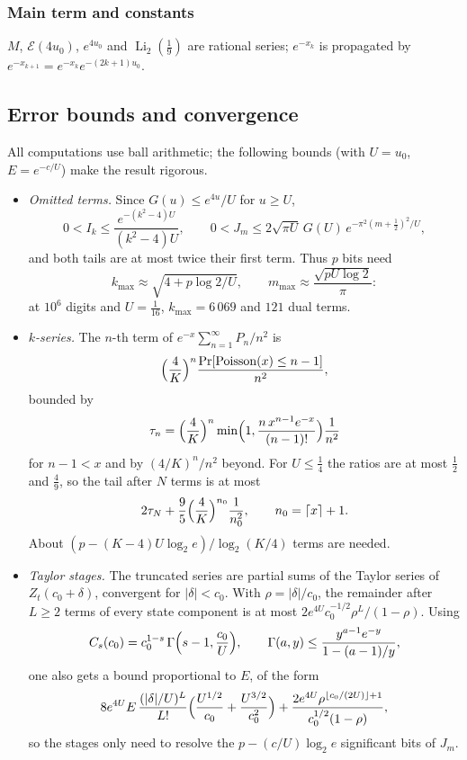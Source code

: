 \documentclass[11pt,reqno]{amsart}
\theoremstyle{definition}
\theoremstyle{remark}
\newcommand{\Eip}{\mathcal{E}}
\newcommand{\Li}{\operatorname{Li}}
\begin{document}
\subsubsection{Main term and constants} $M$, $\Eip(4u_0)$, $e^{4u_0}$ and $\Li_2(\frac19)$ are rational series;
$e^{-x_k}$ is propagated by $e^{-x_{k+1}} = e^{-x_k}e^{-(2k+1)u_0}$.

\subsection{Error bounds and convergence}\label{sec:khbounds}
All computations use ball arithmetic; the following bounds (with $U = u_0$, $E = e^{-c/U}$) make the result rigorous.

\begin{itemize}
\item \emph{Omitted terms.} Since $G(u) \le e^{4u}/U$ for $u \ge U$,
\[
  0 < I_k \le \frac{e^{-(k^2-4)U}}{(k^2-4)U}, \qquad 0 < J_m \le 2\sqrt{\pi U}\,G(U)\,e^{-\pi^2(m+\frac12)^2/U},
\]
and both tails are at most twice their first term. Thus $p$ bits need
\[
  k_{\max} \approx \sqrt{4 + p\log2/U}, \qquad m_{\max} \approx \frac{\sqrt{pU\log 2}}{\pi}:
\]
at $10^6$ digits and $U = \frac1{16}$, $k_{\max} = 6\,069$ and $121$ dual terms.
\item \emph{$k$-series.} The $n$-th term of $e^{-x}\sum_{n=1}^{\infty} P_n/n^2$ is
\[
  \Bigl(\frac4K\Bigr)^n\frac{\Pr[\mathrm{Poisson}(x) \le n-1]}{n^2},
\]
bounded by
\[
  \tau_n = \Bigl(\frac4K\Bigr)^n\min\Bigl(1, \frac{n\,x^{n-1}e^{-x}}{(n-1)!}\Bigr)\frac{1}{n^2}
\]
for $n - 1 < x$ and by $(4/K)^n/n^2$ beyond. For $U \le \frac14$ the ratios are at most $\frac12$ and $\frac49$, so
the tail after $N$ terms is at most
\[
  2\tau_N + \frac95\Bigl(\frac4K\Bigr)^{n_0}\frac1{n_0^2}, \qquad n_0 = \lceil x\rceil + 1.
\]
About $(p - (K-4)U\log_2e)/\log_2(K/4)$ terms are needed.
\item \emph{Taylor stages.} The truncated series are partial sums of the Taylor series of $Z_t(c_0+\delta)$,
convergent for $|\delta| < c_0$. With $\rho = |\delta|/c_0$, the remainder after $L \ge 2$ terms of every state
component is at most $2e^{4U}c_0^{-1/2}\rho^L/(1-\rho)$. Using
\[
  C_s(c_0) = c_0^{1-s}\,\Gamma\Bigl(s-1, \frac{c_0}U\Bigr), \qquad \Gamma(a, y) \le \frac{y^{a-1}e^{-y}}{1 - (a-1)/y},
\]
one also gets a bound proportional to $E$, of the form
\[
  8e^{4U}E\,\frac{(|\delta|/U)^L}{L!}\Bigl(\frac{U^{1/2}}{c_0} + \frac{U^{3/2}}{c_0^2}\Bigr)
  + \frac{2e^{4U}\rho^{\lfloor c_0/(2U)\rfloor+1}}{c_0^{1/2}(1-\rho)},
\]
so the stages only need to resolve the $p - (c/U)\log_2 e$ significant bits of $J_m$.

\end{itemize}
\end{document}
